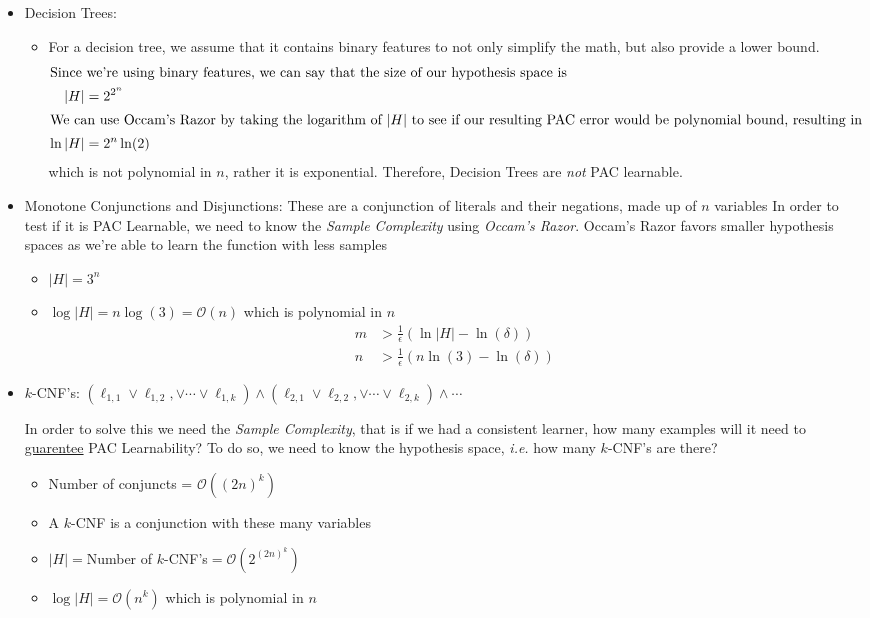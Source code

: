 \documentclass{article}
\newcommand{\abs}[1]{\left| #1\right|}
\newcommand{\BigO}[1]{\mathcal{O}\left( #1\right)}
\begin{document}
\begin{enumerate}
\begin{itemize}
\item Decision Trees:
\begin{itemize}
\item For a decision tree, we assume that it contains binary features to not only simplify the math, but also provide a lower bound. 
\begin{align}
\intertext{Since we're using binary features, we can say that the size of our hypothesis space is}
\abs{H} &= 2^{2^{n}}\\
\intertext{We can use Occam's Razor by taking the logarithm of $\abs{H}$ to see if our resulting PAC error would be polynomial bound, resulting in}
\ln\abs{H} &= 2^{n}\ln(2)
\end{align}
which is not polynomial in $n$, rather it is exponential. Therefore, Decision Trees are {\em not} PAC learnable.
\end{itemize}
\item Monotone Conjunctions and Disjunctions: These are a conjunction of literals and their negations, made up of $n$ variables
In order to test if it is PAC Learnable, we need to know the {\em Sample Complexity} using {\em Occam's Razor}. Occam's Razor favors smaller hypothesis spaces as we're able to learn the function with less samples
\begin{itemize}
\item $\abs{H}=3^{n}$
\item $\log\abs{H} = n\log(3) = \BigO{n}$ which is polynomial in $n$
\begin{align}
m &> \frac{1}{\epsilon}\left(\ln\abs{H}-\ln(\delta)\right)\\
n &> \frac{1}{\epsilon}\left(n\ln(3)-\ln(\delta)\right)
\end{align}
\end{itemize}
\item $k$-CNF's: $\left(\ell_{1,1}\vee\ell_{1,2},\vee\cdots\vee\ell_{1,k}\right)\wedge\left(\ell_{2,1}\vee\ell_{2,2},\vee\cdots\vee\ell_{2,k}\right)\wedge\cdots$

In order to solve this we need the {\em Sample Complexity}, that is if we had a consistent learner, how many examples will it need to \underline{guarentee} PAC Learnability? To do so, we need to know the hypothesis space, {\em i.e.} how many $k$-CNF's are there?
\begin{itemize}
\item Number of conjuncts = $\BigO{\left(2n\right)^{k}}$
\item A $k$-CNF is a conjunction with these many variables
\item $\abs{H}=$Number of $k$-CNF's$=\BigO{2^{\left(2n\right)^{k}}}$
\item $\log\abs{H} = \BigO{n^{k}}$ which is polynomial in $n$
\end{itemize}
\end{itemize}



\end{enumerate}
\end{document}
